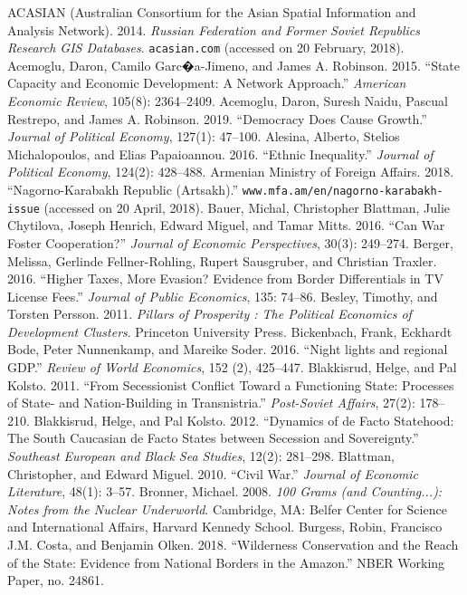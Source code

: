 \documentclass[12pt,a4paper]{article}%
\begin{document}
\begin{thebibliography}{99}
\bibitem{} ACASIAN (Australian Consortium for the Asian Spatial Information and Analysis Network). 2014. \textit{Russian Federation and Former Soviet Republics Research GIS Databases}. \verb!acasian.com! (accessed on 20 February, 2018).
\bibitem{} Acemoglu, Daron, Camilo Garc�a-Jimeno, and James A. Robinson. 2015. ``State Capacity and Economic Development: A Network Approach.'' \textit{American Economic Review}, 105(8): 2364--2409.
\bibitem{} Acemoglu, Daron, Suresh Naidu, Pascual Restrepo, and James A. Robinson. 2019. ``Democracy Does Cause Growth.'' \textit{Journal of Political Economy}, 127(1): 47--100.
\bibitem{} Alesina, Alberto, Stelios Michalopoulos, and Elias Papaioannou. 2016. ``Ethnic Inequality.'' \textit{Journal of Political Economy}, 124(2): 428--488.
\bibitem{} Armenian Ministry of Foreign Affairs. 2018. ``Nagorno-Karabakh Republic (Artsakh).'' \verb!www.mfa.am/en/nagorno-karabakh-issue! (accessed on 20 April, 2018).
\bibitem{} Bauer, Michal, Christopher Blattman, Julie Chytilova, Joseph Henrich, Edward Miguel, and Tamar Mitts. 2016. ``Can War Foster Cooperation?'' \textit{Journal of Economic Perspectives}, 30(3): 249--274.
\bibitem{} Berger, Melissa, Gerlinde Fellner-Rohling, Rupert Sausgruber, and Christian Traxler. 2016. ``Higher Taxes, More Evasion? Evidence from Border Differentials in TV License Fees.'' \textit{Journal of Public Economics}, 135: 74--86.
\bibitem{} Besley, Timothy, and Torsten Persson. 2011. \textit{Pillars of Prosperity : The Political Economics of Development Clusters}. Princeton University Press.
\bibitem{} Bickenbach, Frank, Eckhardt Bode, Peter Nunnenkamp, and Mareike Soder. 2016. ``Night lights and regional GDP.'' \textit{Review of World Economics}, 152 (2), 425--447.
\bibitem{} Blakkisrud, Helge, and Pal Kolsto. 2011. ``From Secessionist Conflict Toward a Functioning State: Processes of State- and Nation-Building in Transnistria.'' \textit{Post-Soviet Affairs}, 27(2): 178--210.
\bibitem{} Blakkisrud, Helge, and Pal Kolsto. 2012. ``Dynamics of de Facto Statehood: The South Caucasian de Facto States between Secession and Sovereignty.'' \textit{Southeast European and Black Sea Studies}, 12(2): 281--298.
\bibitem{} Blattman, Christopher, and Edward Miguel. 2010. ``Civil War.'' \textit{Journal of Economic Literature}, 48(1): 3--57.      
\bibitem{} Bronner, Michael. 2008. \textit{100 Grams (and Counting...): Notes from the Nuclear Underworld}. Cambridge, MA: Belfer Center for Science and International Affairs, Harvard Kennedy School.       
\bibitem{} Burgess, Robin, Francisco J.M. Costa, and Benjamin Olken. 2018. ``Wilderness Conservation and the Reach of the State: Evidence from National Borders in the Amazon.'' NBER Working Paper, no. 24861.                                                                      

\end{thebibliography}
\end{document}
